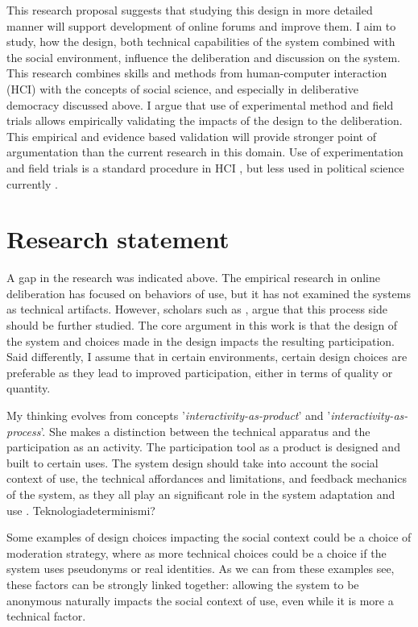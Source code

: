 \documentclass{article}
\begin{document}
This research proposal suggests that studying this design in more detailed manner will support development of online forums and improve them. I aim to study, how the design, both technical capabilities of the system combined with the social environment, influence the deliberation and discussion on the system. This research combines skills and methods from human-computer interaction (HCI) with the concepts of social science, and especially in deliberative democracy discussed above. I argue that use of experimental method and field trials allows empirically validating the impacts of the design to the deliberation. This empirical and evidence based validation will provide stronger point of argumentation than the current research in this domain. Use of experimentation and field trials is a standard procedure in HCI , but less used in political science currently .

\section{Research statement}

A gap in the research was indicated above. The empirical research in online deliberation has focused on behaviors of use, but it has not examined the systems as technical artifacts. However, scholars such as , argue that this process side should be further studied. The core argument in this work is that the design of the system and choices made in the design impacts the resulting participation. Said differently, I assume that in certain environments, certain design choices are preferable as they lead to improved participation, either in terms of quality or quantity.

My thinking evolves from  concepts '\textit{interactivity-as-product}' and '\textit{interactivity-as-process}'. She makes a distinction between the technical apparatus and the participation as an activity. The participation tool as a product is designed and built to certain uses. The system design should take into account the social context of use, the technical affordances and limitations, and feedback mechanics of the system, as they all play an significant role in the system adaptation and use . Teknologiadeterminismi?

Some examples of design choices impacting the social context could be a choice of moderation strategy, where as more technical choices could be a choice if the system uses pseudonyms or real identities. As we can from these examples see, these factors can be strongly linked together: allowing the system to be anonymous naturally impacts the social context of use, even while it is more a technical factor.
\end{document}
